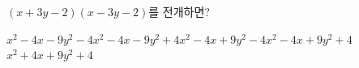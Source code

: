 $(x+3y-2)(x-3y-2)$를 전개하면?
\begin{choicesii}{$x^2-4x-9y^2-4$}{$x^2-4x-9y^2+4$}{$x^2-4x+9y^2-4$}{$x^2-4x+9y^2+4$}{$x^2+4x+9y^2+4$}\end{choicesii}
